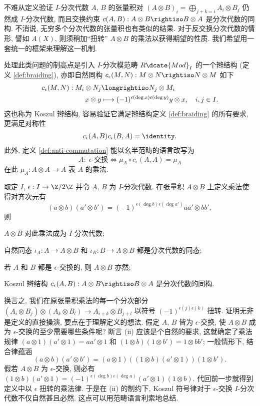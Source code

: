 不难从定义验证 $I$-分次代数 $A$, $B$ 的张量积对 $(A \otimes B)_i = \bigoplus_{j+k=i} A_i \otimes B_j$ 仍然成 $I$-分次代数, 而且交换约束 $c(A,B): A \otimes B \rightiso B \otimes A$ 是分次代数的同构. 不消说, 无穷多个分次代数的张量积也有类似的结果. 对于反交换分次代数的情形, 譬如 $A(X)$, 则须稍加``扭转'' $A \otimes B$ 的乘法以获得期望的性质. 我们希望用一套统一的框架来理解这一机制.

处理此类问题的制高点是引入 $I$-分次模范畴 $R\dcate{Mod}_I$ 的一个辫结构 (定义 \ref{def:braiding}), 亦即自然同构 $c_\epsilon(M, N): M \otimes N \rightiso N \otimes M$ 如下
\begin{align*}
	c_\epsilon(M,N): M_i \otimes N_j & \longrightiso N_j \otimes M_i \\
	x \otimes y & \longmapsto (-1)^{\epsilon(\deg x)\epsilon(\deg y)} y \otimes x, \quad i,j \in I.
\end{align*}
这也称为 Koszul 辫结构, 容易验证它满足辫结构定义 \ref{def:braiding} 的所有要求, 更满足对称性
\begin{gather}\label{eqn:Koszul-braiding-symm}
	c_\epsilon(A,B) c_\epsilon(B, A) = \identity.
\end{gather}
此外, 定义 \ref{def:anti-commutation} 能以幺半范畴的语言改写为
\[ A:\; \epsilon\text{-交换} \iff \mu_A \circ c_\epsilon(A,A) = \mu_A \]
在此 $\mu_A: A \otimes A \to A$ 表 $A$ 的乘法.

\begin{definition-theorem}\label{def:Koszul-sign-alg}
	取定 $I$, $\epsilon: I \to \Z/2\Z$ 并令 $A$, $B$ 为 $I$-分次代数. 在张量积 $A \otimes B$ 上定义乘法使得对齐次元有
	\[ (a \otimes b)(a' \otimes b') = (-1)^{\epsilon(\deg b)\epsilon(\deg a')} aa' \otimes bb' , \]
	则
	\begin{compactenum}[(i)]
		\item $A \otimes B$ 对此乘法成为 $I$-分次代数;
		\item 自然同态 $\iota_A: A \to A \otimes B$ 和 $\iota_B: B \to A \otimes B$ 都是分次代数的同态;
		\item 若 $A$ 和 $B$ 都是 $\epsilon$-交换的, 则 $A \otimes B$ 亦然;
		\item Koszul 辫结构 $c_\epsilon(A, B): A \otimes B \rightiso B \otimes A$ 是分次代数的同构.
	\end{compactenum}
\end{definition-theorem}
换言之, 我们在原张量积乘法的每一个分次部分 $(A_i \otimes B_j) \otimes (A_k \otimes B_l) \to A_{i+k} \otimes B_{j+l}$ 以符号 $(-1)^{\epsilon(j)\epsilon(k)}$ 扭转. 证明无非是定义的直接操演, 要点在于理解定义的想法. 假定 $A$, $B$ 皆为 $\epsilon$-交换, 使 $A \otimes B$ 成为 $\epsilon$-交换的至少需要哪些条件呢? 断言 (ii) 应该是个自然的要求, 这就确定了乘法规律 $(a \otimes 1)(a' \otimes 1) = aa' \otimes 1$ 和 $(1 \otimes b)(1 \otimes b') = 1 \otimes bb'$; 一般情形下, 结合律蕴涵
\[ (a \otimes b)(a' \otimes b') = (a \otimes 1) \left((1 \otimes b)(a' \otimes 1)\right) (1 \otimes b'). \]
假若 $A \otimes B$ 为 $\epsilon$-交换, 则必有 $(1 \otimes b)(a' \otimes 1) = (-1)^{\epsilon(\deg b)\epsilon(\deg a)} (a' \otimes 1)(1 \otimes b)$. 代回前一步就得到定义中以 $\epsilon$ 扭转的乘法律. 于是在 (ii) 的制约下, Koszul 符号律对于 $\epsilon$-交换 $I$-分次代数不仅自然甚且必然. 这点可以用范畴语言利索地总结.

